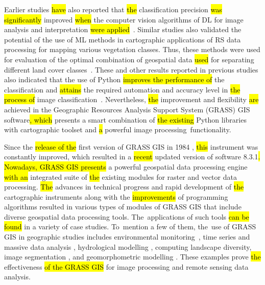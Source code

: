 \documentclass[coasts,article,accept,pdftex,oneauthor]{Definitions/mdpi}
\begin{document}
Earlier studies \hl{have} also reported that \hl{the} classification precision \hl{was significantly} improved \hl{when} the\hl{ }computer vision algorithms of DL for image analysis and interpretation \hl{were applied}~\cite{GUO20231,rs15215121,DOU2021102477}. Similar studies also validated the potential of the use of ML methods in cartographic{ }applications {of RS data processing }for mapping various vegetation classes{. Thus, these methods were used for evaluation of }the optimal combination of geospatial data \hl{used }for separating different land cover classes~\cite{BOULILA2021106014,LIN2024102618}. These and other{ }results {reported in previous studies }also indicated that\hl{ }the use of Python \hl{improves the performance of} the classification and \hl{attains} the required automation and accuracy level in \hl{the process of }image classification~\cite{ROBERTS2022105192,GUO2023e21542,Redoloza}. Nevertheless, \hl{the }improvement and flexibility \hl{are} achieved in the Geographic Resources Analysis Support System (GRASS) GIS software\hl{, which} presents a smart combination of \hl{the existing }Python libraries with cartographic toolset and \hl{a} powerful image processing~functionality. 

{Since the \hl{release of the }first version of\hl{ }GRASS GIS\hl{ }in 1984} \cite{GRASS_GIS_software}, {\hl{this} instrument was constantly improved, which resulted in a \hl{recent }updated version of software 8.3.1\hl{. Nowadays, GRASS GIS presents} a powerful geospatial data processing engine \hl{with an} integrated suite of \hl{the }existing modules for raster and vector data processing. \hl{The }advances in technical progress and rapid development of \hl{the }cartographic instruments along with the \hl{improvements} of programming algorithms resulted in various types of modules of GRASS GIS that include diverse geospatial data processing tools. The~applications of such tools \hl{can be found} in a variety of case studies. To~mention a few of them, the~use of GRASS GIS in geographic studies includes environmental monitoring}~\cite{STRIGARO201668,Lemenkova202322}, {time series and massive data analysis} \cite{JASIEWICZ20111525,Lemenkova202313}, {hydrological modelling} \cite{JASIEWICZ20111162}, {computing landscape diversity, image segmentation} \cite{Lemenkova202320,ROCCHINI201382}, {and geomorphometric modelling} \cite{HOFIERKA2009387}. {These\hl{ }examples\hl{ }prove \hl{the} effectiveness \hl{of the GRASS GIS }for image processing and remote sensing data analysis.}

\end{document}
